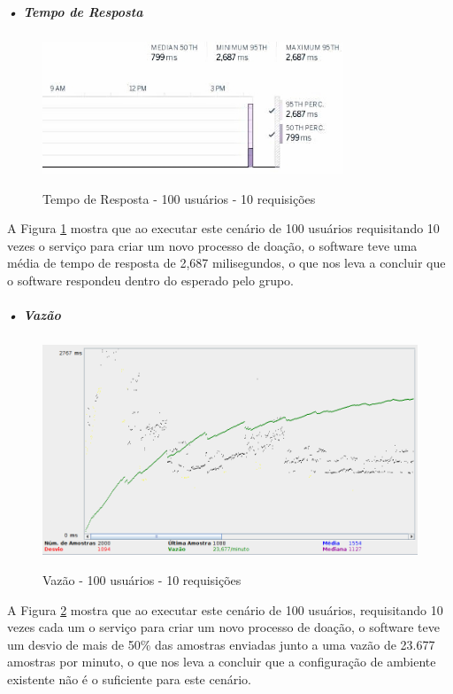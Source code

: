 \documentclass[portuguese,oneside]{tcc}
\begin{document}
\subparagraph{• Tempo de Resposta}
\begin{figure}[htp]
\centering
\caption{Tempo de Resposta - 100 usuários - 10 requisições}
\includegraphics[width=9cm]{100-10-response-time}
\label{fig:tempo-reposta-100-10}
\end{figure}

A Figura \ref{fig:tempo-reposta-100-10} mostra que ao executar este cenário de 100 usuários requisitando 10 vezes o serviço para criar um novo processo de doação, o software teve uma média de tempo de resposta de 2,687 milisegundos, o que nos leva a concluir que o software respondeu dentro do esperado pelo grupo.

\subparagraph{• Vazão}
\begin{figure}[htp]
\centering
\caption{Vazão - 100 usuários - 10 requisições}
\includegraphics[width=15cm]{100-10-throughput}
\label{fig:throughput-100-10}
\end{figure}

A Figura \ref{fig:throughput-100-10} mostra que ao executar este cenário de 100 usuários, requisitando 10 vezes cada um o serviço para criar um novo processo de doação, o software teve um desvio de mais de 50\% das amostras enviadas junto a uma vazão de 23.677 amostras por minuto, o que nos leva a concluir que a configuração de ambiente existente não é o suficiente para este cenário.

\newpage
\end{document}
